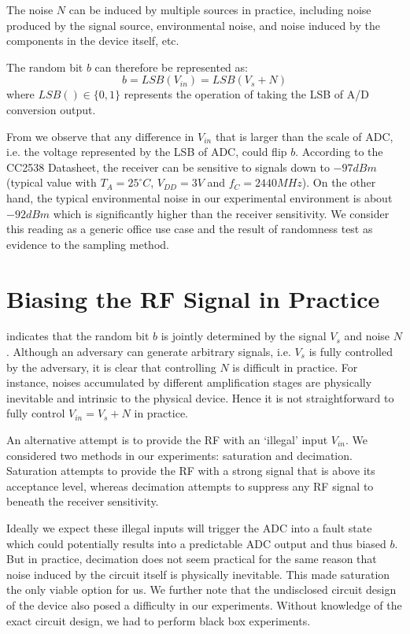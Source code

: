 The noise $N$ can be induced by multiple sources in practice, including noise produced by the signal source, environmental noise, and noise induced by the components in the device itself, etc.

The random bit $b$ can therefore be represented as:
\begin{equation} \label{RNDOutput}
b = LSB(V_{in}) = LSB(V_s + N)
\end{equation}
where $LSB() \in \{0,1\}$ represents the operation of taking the LSB of A/D conversion output.

From  we observe that any difference in $V_{in}$ that is larger than the scale of ADC, i.e. the voltage represented by the LSB of ADC, could flip $b$. According to the CC2538 Datasheet\cite{CC2538Datasheet}, the receiver can be sensitive to signals down to $-97dBm$ (typical value with $T_A = 25^{\circ}C$, $V_{DD} = 3V$ and $f_{C} = 2440MHz$). On the other hand, the typical environmental noise in our experimental environment is about $-92dBm$ which is significantly higher than the receiver sensitivity. We consider this reading as a generic office use case and the result of randomness test  as evidence to the sampling method.

\section{Biasing the RF Signal in Practice}\label{Jamming}
  indicates that the random bit $b$ is jointly determined by the signal $V_s$ and noise $N$. Although an adversary can generate arbitrary signals, i.e. $V_s$ is fully  controlled by the adversary, it is clear that controlling $N$ is difficult in practice. For instance, noises accumulated by different amplification stages are physically inevitable and intrinsic to the physical device. Hence it is not straightforward to fully control $V_{in}= V_s +N$ in practice.

An alternative attempt is to provide the RF with an `illegal' input $V_{in}$. We considered two methods in our experiments: saturation and decimation. Saturation attempts to provide the RF with a strong signal that is above its acceptance level, whereas decimation attempts to suppress any RF signal to beneath the receiver sensitivity.

Ideally we expect these illegal inputs will trigger the ADC into a fault state which could potentially results into a predictable ADC output and thus biased $b$. But in practice, decimation does not seem practical for the same reason that noise induced by the circuit itself is physically inevitable. This made saturation the only viable option for us. We further note that the undisclosed circuit design of the device also posed a difficulty in our experiments. Without knowledge of the exact circuit design, we had to perform black box experiments. 

